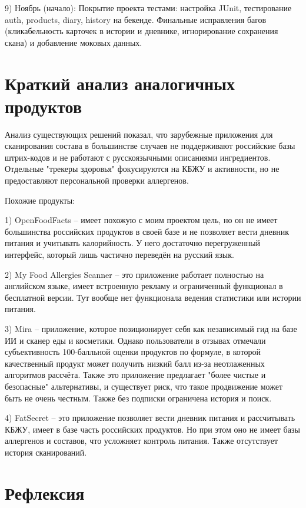\documentclass[14pt,a4paper]{extarticle}
\begin{document}
9) Ноябрь (начало): Покрытие проекта тестами: настройка JUnit, тестирование auth, products, diary, history на бекенде. Финальные исправления багов (кликабельность карточек в истории и дневнике, игнорирование сохранения скана) и добавление моковых данных.



\section{Краткий анализ аналогичных продуктов}

Анализ существующих решений показал, что зарубежные приложения для сканирования состава в большинстве случаев не поддерживают российские базы штрих-кодов и не работают с русскоязычными описаниями ингредиентов. Отдельные "трекеры здоровья" фокусируются на КБЖУ и активности, но не предоставляют персональной проверки аллергенов.

Похожие продукты:

1) OpenFoodFacts – имеет похожую с моим проектом цель, но он не имеет большинства российских продуктов в своей базе и не позволяет вести дневник питания и учитывать калорийность. У него достаточно перегруженный интерфейс, который лишь частично переведён на русский язык.

2) My Food Allergies Scanner – это приложение работает полностью на английском языке, имеет встроенную рекламу и ограниченный функционал в бесплатной версии. Тут вообще нет функционала ведения статистики или истории питания.

3) Mira – приложение, которое позиционирует себя как независимый гид на базе ИИ и сканер еды и косметики. Однако пользователи в отзывах отмечали субъективность 100-балльной оценки продуктов по формуле, в которой качественный продукт может получить низкий балл из-за неотлаженных алгоритмов рассчёта. Также это приложение предлагает "более чистые и безопасные" альтернативы, и существует риск, что такое продвижение может быть не очень честным. Также без подписки ограничена история и поиск.

4) FatSecret – это приложение позволяет вести дневник питания и рассчитывать КБЖУ, имеет в базе часть российских продуктов. Но при этом оно не имеет базы аллергенов и составов, что усложняет контроль питания. Также отсутствует история сканирований.


\section{Рефлексия}
\end{document}
